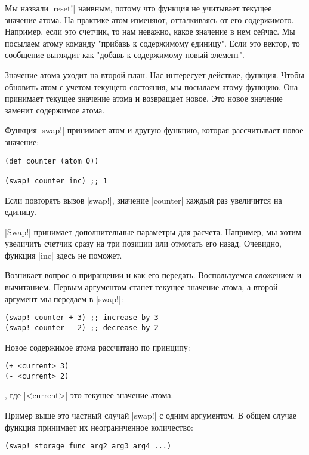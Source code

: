 Мы назвали \spverb|reset!| наивным, потому что функция не учитывает текущее значение
атома. На практике атом изменяют, отталкиваясь от его содержимого. Например,
если это счетчик, то нам неважно, какое значение в нем сейчас. Мы посылаем атому
команду "прибавь к содержимому единицу". Если это вектор, то сообщение выглядит
как "добавь к содержимому новый элемент".

Значение атома уходит на второй план. Нас интересует действие, функция. Чтобы
обновить атом с учетом текущего состояния, мы посылаем атому функцию. Она
принимает текущее значение атома и возвращает новое. Это новое значение заменит
содержимое атома.

Функция \spverb|swap!| принимает атом и другую функцию, которая рассчитывает новое
значение:

\begin{verbatim}
(def counter (atom 0))

(swap! counter inc) ;; 1
\end{verbatim}

Если повторять вызов \spverb|swap!|, значение \spverb|counter| каждый раз увеличится на
единицу.

\spverb|Swap!| принимает дополнительные параметры для расчета. Например, мы хотим
увеличить счетчик сразу на три позиции или отмотать его назад. Очевидно, функция
\spverb|inc| здесь не поможет.

Возникает вопрос о приращении и как его передать. Воспользуемся сложением и
вычитанием. Первым аргументом станет текущее значение атома, а второй аргумент
мы передаем в \spverb|swap!|:

\begin{verbatim}
(swap! counter + 3) ;; increase by 3
(swap! counter - 2) ;; decrease by 2
\end{verbatim}

Новое содержимое атома рассчитано по принципу:

\begin{verbatim}
(+ <current> 3)
(- <current> 2)
\end{verbatim}

, где \spverb|<current>| это текущее значение атома.

Пример выше это частный случай \spverb|swap!| с одним аргументом. В общем случае
функция принимает их неограниченное количество:

\begin{verbatim}
(swap! storage func arg2 arg3 arg4 ...)
\end{verbatim}

